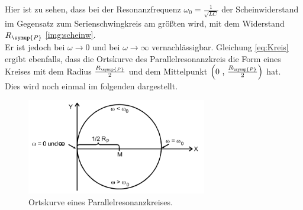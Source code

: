     \noindent Hier ist zu sehen, dass bei der Resonanzfrequenz $\omega_0 = \frac{1}{\sqrt{LC}}$ der Scheinwiderstand im Gegensatz zum 
    Serienschwingkreis am größten wird, mit dem Widerstand $R_{\symup{P}}$ \ref{img:scheinw}.\\
    Er ist jedoch bei $\omega \to 0$ und bei $\omega \to \infty$ 
    vernachlässigbar. Gleichung \ref{eq:Kreis} ergibt ebenfalls, dass die Ortskurve des Parallelresonanzkreis die Form eines Kreises 
    mit dem Radius $\frac{R_{\symup{P}}}{2}$ und dem Mittelpunkt $\left( \text{0 , } \frac{R_{\symup{P}}}{2} \right)$ hat.\\
    Dies wird noch einmal im folgenden dargestellt.

    
    \begin{figure}[H]
        \centering
        \includegraphics[width=0.7\textwidth]{images/Ortskurve.PNG}
        \caption{Ortskurve eines Parallelresonanzkreises.\protect \cite{V354}}
        \label{img:orts}
    \end{figure}
